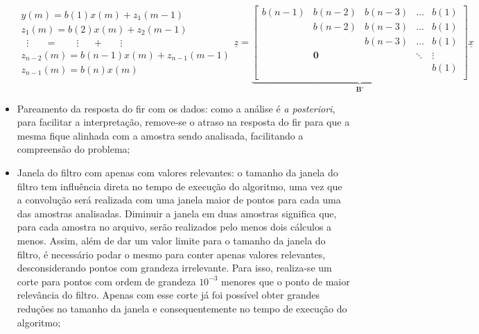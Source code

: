 \begin{itemize}
\begin{subequations}
\begin{eqnarray}\label{eq:y_m_fir}
y(m) = b(1)x(m)+z_1(m-1)  \nonumber \\
z_1(m) = b(2)x(m)+z_2(m-1)  \nonumber \\
\;\;\vdots\;\;\;\;\;\; =
\;\;\;\;\;\;\;\vdots\;\;\;\;\;+\;\;\;\;\;\;\vdots\;\;\;\;\;\;\;  \\
z_{n-2}(m) = b(n-1)x(m)+z_{n-1}(m-1)  \nonumber \\
z_{n-1}(m) = b(n)x(m) \nonumber
\end{eqnarray}
\begin{equation} \label{eq:matrix_fir}
\underline{z} = 
\underbrace{\begin{bmatrix}
b(n-1) & b(n-2)   & b(n-3) & \dots & b(1) \\
       & b(n-2)   & b(n-3) & \dots & b(1) \\
       &          & b(n-3) & \dots & b(1) \\
       &\mathbf{0}&        & \ddots & \vdots \\
       &          &        &        & b(1) \\
\end{bmatrix}}_{\mathbf{B}'}\underline{x}
\end{equation}
\end{subequations}

\item Pareamento da resposta do \acs{fir} com os dados: como a análise
é \emph{a posteriori}, para facilitar a interpretação, remove-se o
atraso na resposta do \acs{fir} para que a mesma fique alinhada com a
amostra sendo analisada, facilitando a compreensão do problema;

\item Janela do filtro com apenas com valores relevantes: o tamanho da
janela do filtro tem influência direta no tempo de execução do
algoritmo, uma vez que a convolução será realizada com uma janela
maior de pontos para cada uma das amostras analisadas. Diminuir a
janela em duas amostras significa que, para cada amostra no arquivo,
serão realizados pelo menos dois cálculos a menos. Assim, além de dar
um valor limite para o tamanho da janela do filtro, é necessário podar
o mesmo para conter apenas valores relevantes, desconsiderando pontos
com grandeza irrelevante. Para isso, realiza-se um corte para pontos
com ordem de grandeza $10^{-3}$ menores que o ponto de maior
relevância do filtro. Apenas com esse corte já foi possível obter
grandes reduções no tamanho da janela e consequentemente no tempo de
execução do algoritmo;


\end{itemize}
